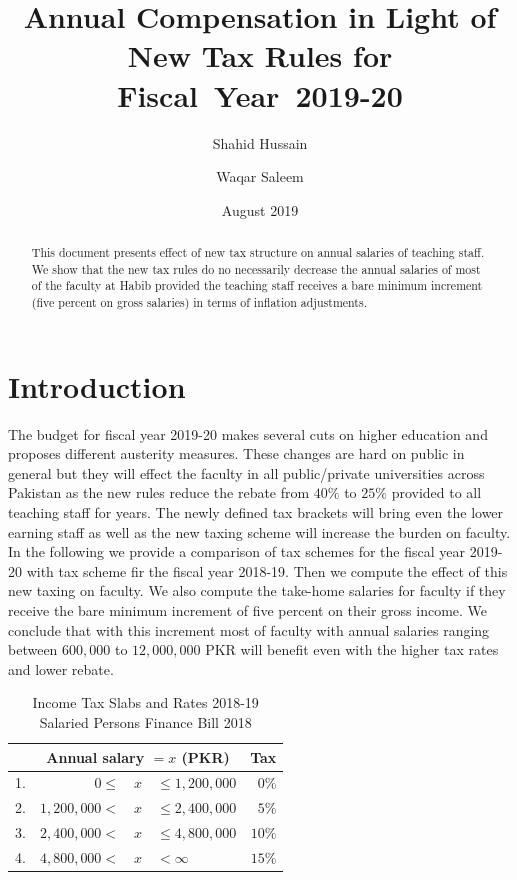 \documentclass[a4paper,11pt]{article}
\begin{document}
\title{Annual Compensation in Light of New Tax Rules for Fiscal~Year~2019-20}
\author{Shahid Hussain \and Waqar Saleem}
\date{August 2019}
\maketitle
	
\begin{abstract}
This document presents effect of new tax structure on annual salaries of teaching staff. We show that the new tax rules do no necessarily decrease the annual salaries of most of the faculty at Habib provided the teaching staff receives a bare minimum increment (five percent on gross salaries) in terms of inflation adjustments.  	
\end{abstract}
	
\section{Introduction}
The budget for fiscal year 2019-20 makes several cuts on higher education and proposes different austerity measures. These changes are hard on public in general but they will effect the faculty in all public/private universities across Pakistan as the new rules reduce the rebate from  $40\%$ to $25\%$ provided to all teaching staff for years. The newly defined tax brackets will bring even the lower earning staff as well as the new taxing scheme will increase the burden on faculty. In the following we provide a comparison of tax schemes for the fiscal year 2019-20 with tax scheme fir the fiscal year 2018-19. Then we compute the effect of this new taxing on faculty. We also compute the take-home salaries for faculty if they receive the bare minimum increment of five percent on their gross income. We conclude that with this increment most of faculty with annual salaries ranging between $600{,}000$ to $12,{000}{,}000$ PKR will benefit even with the higher tax rates and lower rebate.

\begin{table}[h]\centering
	\begin{tabular}{rrclr}\toprule
		& \multicolumn{3}{c}{\textbf{Annual salary $=x$ (PKR)}} & \textbf{Tax} \\ \midrule
		1. & $0 \leq$ & $x$ & $\leq 1{,}200{,}000$  & $0\%$ \\ \midrule
		2. & $1{,}200{,}000 <$ & $x$ & $\leq 2{,}400{,}000$  & $5\%$ \\ \midrule
		3. & $2{,}400{,}000 <$ & $x$ & $\leq 4{,}800{,}000$  & $10\%$ \\ \midrule
		4. & $4{,}800{,}000 <$ & $x$ & $< \infty$  & $15\%$ \\ \bottomrule
	\end{tabular}
	\caption{Income Tax Slabs and Rates 2018-19 Salaried Persons Finance Bill 2018}
	\label{tab:tax-18-19}
\end{table}
\end{document}
